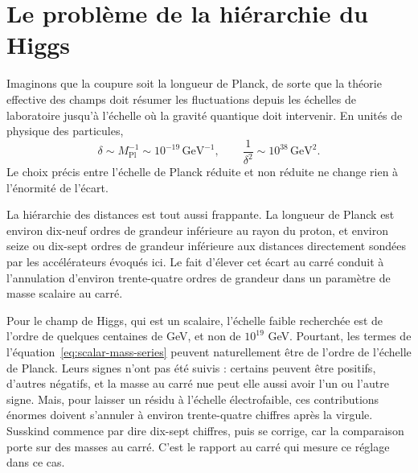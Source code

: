 \section{Le problème de la hiérarchie du Higgs}

Imaginons que la coupure soit la longueur de Planck, de sorte que la théorie effective des champs doit résumer les fluctuations depuis les échelles de laboratoire jusqu’à l’échelle où la gravité quantique doit intervenir. En unités de physique des particules,
\begin{equation}
\delta\sim M_{\mathrm{Pl}}^{-1}\sim10^{-19}\,\mathrm{GeV}^{-1},
\qquad
\frac{1}{\delta^2}\sim10^{38}\,\mathrm{GeV}^2.
\label{eq:planck-cutoff}
\end{equation}
Le choix précis entre l’échelle de Planck réduite et non réduite ne change rien à l’énormité de l’écart.

La hiérarchie des distances est tout aussi frappante. La longueur de Planck est environ dix-neuf ordres de grandeur inférieure au rayon du proton, et environ seize ou dix-sept ordres de grandeur inférieure aux distances directement sondées par les accélérateurs évoqués ici. Le fait d’élever cet écart au carré conduit à l’annulation d’environ trente-quatre ordres de grandeur dans un paramètre de masse scalaire au carré.

Pour le champ de Higgs, qui est un scalaire, l’échelle faible recherchée est de l’ordre de quelques centaines de GeV, et non de \(10^{19}\) GeV. Pourtant, les termes de l’équation~\eqref{eq:scalar-mass-series} peuvent naturellement être de l’ordre de l’échelle de Planck.
Leurs signes n’ont pas été suivis : certains peuvent être positifs, d’autres négatifs, et la masse au carré nue peut elle aussi avoir l’un ou l’autre signe. Mais, pour laisser un résidu à l’échelle électrofaible, ces contributions énormes doivent s’annuler à environ trente-quatre chiffres après la virgule. Susskind commence par dire dix-sept chiffres, puis se corrige, car la comparaison porte sur des masses au carré. C’est le rapport au carré qui mesure ce réglage dans ce cas.

\begin{classroomqa}
\end{classroomqa}

